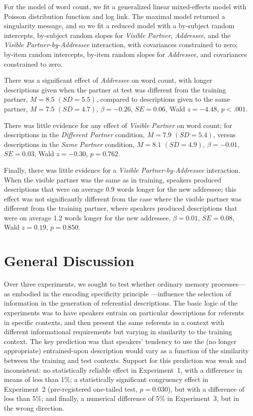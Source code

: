 \documentclass[natbib,doc,a4paper]{apa6}
\begin{document}
For the model of word count, we fit a generalized linear mixed-effects model with Poisson distribution function and log link.  The maximal model returned a singularity message, and so we fit a reduced model with a by-subject random intercepts, by-subject random slopes for \emph{Visible Partner}, \emph{Addressee}, and the \emph{Visible Partner-by-Addressee} interaction, with covariances constrained to zero; by-item random intercepts, by-item random slopes for \emph{Addressee}, and covariances constrained to zero.

There was a significant effect of \emph{Addressee} on word count, with longer descriptions given when the partner at test was different from the training partner,
\(M = 8.5\)  \((SD = 5.5)\),
compared to descriptions given to the same partner,
\(M = 7.5\)  \((SD = 4.7)\),
\(\beta = -0.26\), \(SE = 0.06\), Wald \(z = -4.48\), \(p < .001\).

There was little evidence for any effect of \emph{Visible Partner} on word count; 
for descriptions in the \emph{Different Partner} condition,
\(M = 7.9\)  \((SD = 5.4)\),
versus descriptions in the \emph{Same Partner} condition,
\(M = 8.1\)  \((SD = 4.9)\),
\(\beta = -0.01\), \(SE = 0.03\), Wald \(z = -0.30\), \(p = 0.762\).

Finally, there was little evidence for a \emph{Visible Partner-by-Addressee} interaction. When the visible partner was the same as in training, speakers produced descriptions that were on average 
0.9 
words longer for the new addressee; 
this effect was not significantly different from the case where the visible partner was different from the training partner, where speakers produced descriptions that were on average
1.2
words longer for the new addressee,
\(\beta = 0.01\), \(SE = 0.08\), Wald \(z = 0.19\), \(p = 0.850\).

\section*{General Discussion}
\label{sec:org8a67df9}
Over three experiments, we sought to test whether ordinary memory processes---as embodied in the encoding specificity principle \citep{tulvingthomson73}---influence the selection of information in the generation of referential descriptions. The basic logic of the experiments was to have speakers entrain on particular descriptions for referents in specific contexts, and then present the same referents in a context with different informational requirements but varying in similarity to the training context. The key prediction was that speakers' tendency to use the (no longer appropriate) entrained-upon description would vary as a function of the similarity between the training and test contexts. Support for this prediction was weak and inconsistent: no statistically reliable effect in Experiment~1, with a difference in means of less than 1\%; a statistically significant congruency effect in Experiment~2 (pre-registered one-tailed test, \(p =\)0.030), but with a difference of less than 5\%; and finally, a numerical difference of 5\% in Experiment~3, but in the wrong direction.
\end{document}
